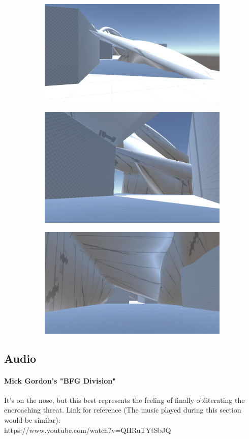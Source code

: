 \documentclass[letterpaper]{report}
\begin{document}
				\begin{figure}[H]
					\begin{subfigure}[h]{.32\linewidth}
					\includegraphics[width=\linewidth]{level3-1}
					\end{subfigure}
					\begin{subfigure}[h]{.32\linewidth}
					\includegraphics[width=\linewidth]{level3-2}
					\end{subfigure}
					\begin{subfigure}[h]{.32\linewidth}
					\includegraphics[width=\linewidth]{level3-3}
					\end{subfigure}
				\end{figure}
			\subsection{Audio}
				\paragraph{Mick Gordon's "BFG Division"} It's on the nose, but this best represents the feeling of finally obliterating the encroaching threat. Link for reference (The music played during this section would be similar): \\ https://www.youtube.com/watch?v=QHRuTYtSbJQ
			
\end{document}

